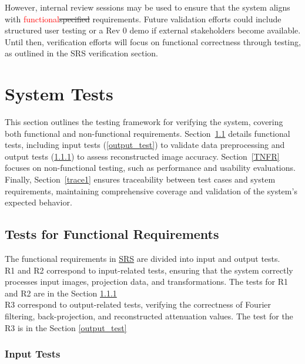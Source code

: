 \documentclass[12pt, titlepage]{article}
\newcommand{\add}{\textcolor{red}}
\begin{document}
However, internal review sessions may be used to ensure that the system
aligns with \add{functional}\st{specified} requirements. Future validation efforts could include
structured user testing or a Rev 0 demo if external stakeholders become
available. Until then, verification efforts will focus on functional correctness
through testing, as outlined in the SRS verification section.


\section{System Tests} \label{sec4} This section outlines the testing framework
for verifying the system, covering both functional and non-functional
requirements. Section~\ref{TFR} details functional tests, including input tests
(\ref{output_test}) to validate data preprocessing and output tests
(\ref{input_test}) to assess reconstructed image accuracy. Section~\ref{TNFR}
focuses on non-functional testing, such as performance and usability
evaluations. Finally, Section~\ref{trace1} ensures traceability between test cases and
system requirements, maintaining comprehensive coverage and validation of the
system’s expected behavior.

\subsection{Tests for Functional Requirements} \label{TFR}
The functional requirements in \href{https://github.com/marischan888/Computed-Tomography-Image-Reconstruction/blob/main/docs/SRS/SRS.pdf}{SRS} are divided into input and output
tests. \\
R1 and R2 correspond to input-related tests, ensuring that the system
correctly processes input images, projection data, and transformations. The
tests for R1 and R2 are in the Section \ref{input_test} \\
R3 correspond to output-related tests, verifying the correctness of
Fourier filtering, back-projection, and reconstructed attenuation values. The
test for the R3 is in the Section \ref{output_test} \\

\subsubsection{Input Tests} \label{input_test}
\end{document}
